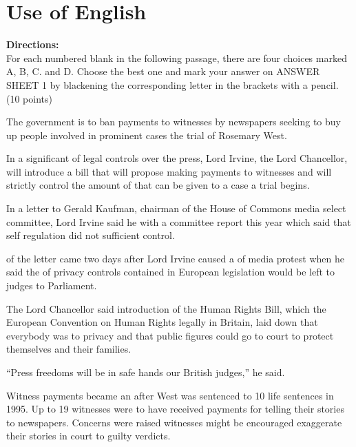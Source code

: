 
\section{Use of English}

\noindent
\textbf{Directions:}\\
For each numbered blank in the following passage, there are four
	choices marked A, B,
	C. and
	D.  Choose the best
	one and mark your answer on ANSWER SHEET 1 by blackening the
	corresponding letter in the brackets with a pencil. (10 points)


\TiGanSpace

The government is to ban payments to witnesses by newspapers seeking to
buy up people involved in prominent cases \cloze the trial of
Rosemary West.

In a significant \cloze of legal controls over the press, Lord
Irvine, the Lord Chancellor, will introduce a \cloze bill that
will propose making payments to witnesses \cloze and will
strictly control the amount of \cloze that can be given to a case
\cloze a trial begins.

In a letter to Gerald Kaufman, chairman of the House of Commons media
select committee, Lord Irvine said he \cloze with a committee
report this year which said that self regulation did not \cloze
sufficient control.

\cloze of the letter came two days after Lord Irvine caused a
\cloze of media protest when he said the \cloze of
privacy controls contained in European legislation would be left to
judges \cloze to Parliament.

The Lord Chancellor said introduction of the Human Rights Bill, which
\cloze the European Convention on Human Rights legally
\cloze in Britain, laid down that everybody was \cloze
to privacy and that public figures could go to court to protect
themselves and their families.

``Press freedoms will be in safe hands \cloze our British
judges,'' he said.

Witness payments became an \cloze after West was sentenced to 10
life sentences in 1995. Up to 19 witnesses were \cloze to have
received payments for telling their stories to newspapers. Concerns were
raised \cloze witnesses might be encouraged exaggerate their
stories in court to \cloze guilty verdicts.


